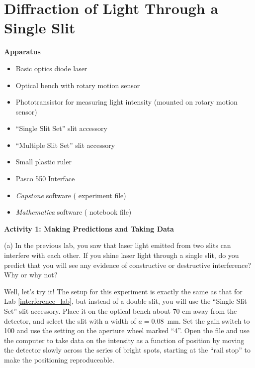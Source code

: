 \section{Diffraction of Light Through a Single Slit}


\makelabheader %

\bigskip
\textbf{Apparatus}

\begin{itemize}[nosep]
\item Basic optics diode laser
\item Optical bench with rotary motion sensor
\item Phototransistor for measuring light intensity (mounted on rotary motion sensor)
\item ``Single Slit Set'' slit accessory
\item ``Multiple Slit Set'' slit accessory
\item Small plastic ruler
\item Pasco 550 Interface
\item \textit{Capstone} software ( experiment file)
\item \textit{Mathematica} software ( notebook file)
\end{itemize}

\bigskip
\textbf{Activity 1: Making Predictions and Taking Data}

(a) In the previous lab, you saw that laser light emitted from two slits can interfere with each other.  If you shine laser light through a single slit, do you predict that you will see any evidence of constructive or destructive interference?  Why or why not?
\answerspace{0.8in}


Well, let's try it!  The setup for this experiment is exactly the same as that for Lab \ref{interference_lab},  but instead of a double slit, you will use the ``Single Slit Set'' slit accessory.  Place it on the optical bench about 70 cm away from the detector, and select the slit with a width of $a = 0.08$~mm.   Set the gain switch to 100 and use the setting on the aperture wheel marked ``4''.   Open the file  and use the computer to take data on the intensity as a function of position by moving the detector slowly across the series of bright spots, starting at the ``rail stop'' to make the positioning reproduceable.  

